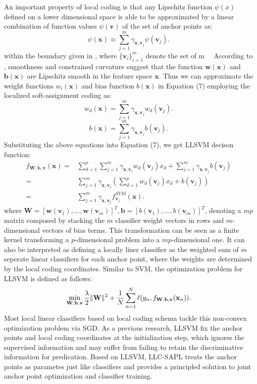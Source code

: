 \documentclass{llncs}
\DeclarePairedDelimiter\norm{\lVert}{\rVert}
\def \x {\mathbf{x}}
\def \w {\mathbf{w}}
\def \W {\mathbf{W}}
\def \v {\mathbf{v}}
\def \b {\mathbf{b}}
\begin{document}
	An important property of local coding is that any Lipschitz function $\psi(x)$ defined on a lower dimensional space is able to be approximated by a linear combination of function values $\psi(\v)$ of the set of anchor points as:
	\begin{equation}
	\psi(\x)\approx \sum_{j=1}^{m}\gamma_{\x,\v_j}\psi(\v_j).
	\end{equation}
	within the boundary given in \cite{12}, where $\{\v_i\}_{i=1}^m$ denote the set of m 　According to \cite{2} \cite{12}, smoothness and constrained curvature suggest that the function $\w(\x)$ and $\b(\x)$ are Lipschitz smooth in the feature space $\x$.
	Thus we can approximate the weight functions $w_i(\x)$ and bias function $b(\x)$ in Equation (7) employing the localized soft-assignment coding as:
	\begin{equation}
	w_d(\x) = \sum_{j=1}^m\gamma_{\x,\v_j}w_d(\v_j).
	\end{equation}
	\begin{equation}
	b(\x) = \sum_{j=1}^m\gamma_{\x,\v_j}b(\v_j).
	\end{equation}
	Substituting the above equations into Equation (7), we get LLSVM decison function:
	\begin{equation}
	\begin{split}
	f_{\W,\b,\v}(\x){}=& \sum_{d=1}^p\sum_{j=1}^m\gamma_{\x,\v_i}w_d(\v_j)x_d + \sum_{j=1}^m\gamma_{\x,\v_j}b(\v_j) \\
	{}=&\sum_{j=1}^m\gamma_{\x,\v_j}(\sum_{d=1}^p w_d(\v_j)x_d+b(\v_j)) \\
	{}=&\sum_{j=1}^m\gamma_{\x,\v_j}f^{SVM}_{\v_j}(\x).
	\end{split}
	\end{equation}
	where $\W = [\w(\v_1),...,\w(\v_m)]^T, \b=[b(\v_1),...,b(\v_m)]^T$, denoting a $mp$ matrix composed by stacking the $m$ classifier weight vectors in rows and $m$-dimensional vectors of bias terms. This transformation can be seen as a finite kernel transforming a $p$-dimensional problem into a $mp$-dimensional one. It can also be interpreted as defining a locally liner classifier as the weighted sum of $m$ seperate linear classifiers for each anchor point, where the weights are determined by the local coding coordinates. Similar to SVM, the optimization problem for LLSVM is defined as follows:
	\begin{equation}
	\min_{\W,\b,\v} \frac{\lambda}{2}\norm{\W}^2 + \frac{1}{N}\sum_{n=1}^{N}\ell(y_n,f_{\W,\b,\v}(\x_n)).
	\end{equation}
	Most local linear classifiers based on local coding schema \cite{2} \cite{4} tackle this non-convex optimization problem via SGD. As a previous research, LLSVM \cite{2} fix the anchor points and local coding coordinates at the initialization step, which ignores the supervised information and may suffer from failing to retain the discriminative information for predication. Based on LLSVM, LLC-SAPL \cite{4} treats the anchor points as parametes just like classifiers and provides a principled solution to joint anchor point optimization and classifier training.
\end{document}
